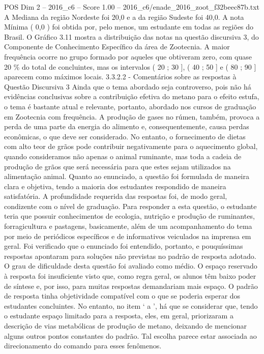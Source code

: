 \begin{textsample}{POS Dim 2 – 2016\_c6 – Score 1.00 – 2016\_c6/enade\_2016\_zoot\_f32beec87b.txt}
A Mediana da região Nordeste foi 20,0 e a da região Sudeste foi 40,0.
A nota Mínima ( 0,0 ) foi obtida por, pelo menos, um estudante em todas as regiões do Brasil.
O Gráfico 3.11 mostra a distribuição das notas na questão discursiva 3, do Componente de Conhecimento Específico da área de Zootecnia.
A maior frequência ocorre no grupo formado por aqueles que obtiveram zero, com quase 20 \% do total de concluintes, mas os intervalos ( 20 ; 30 ], ( 40 ; 50 ] e ( 80 ; 90 ] aparecem como máximos locais. 3.3.2.2 - Comentários sobre as respostas à Questão Discursiva 3 Ainda que o tema abordado seja controverso, pois não há evidências conclusivas sobre a contribuição efetiva do metano para o efeito estufa, o tema é bastante atual e relevante, portanto, abordado nos cursos de graduação em Zootecnia com frequência.
A produção de gases no rúmen, também, provoca a perda de uma parte da energia do alimento e, consequentemente, causa perdas econômicas, o que deve ser considerado.
No entanto, o fornecimento de dietas com alto teor de grãos pode contribuir negativamente para o aquecimento global, quando consideramos não apenas o animal ruminante, mas toda a cadeia de produção de grãos que será necessária para que estes sejam utilizados na alimentação animal.
Quanto ao enunciado, a questão foi formulada de maneira clara e objetiva, tendo a maioria dos estudantes respondido de maneira satisfatória.
A profundidade requerida das respostas foi, de modo geral, condizente com o nível de graduação.
Para responder a esta questão, o estudante teria que possuir conhecimentos de ecologia, nutrição e produção de ruminantes, forragicultura e pastagens, basicamente, além de um acompanhamento do tema por meio de periódicos específicos e de informativos veiculados na imprensa em geral.
Foi verificado que o enunciado foi entendido, portanto, e pouquíssimas respostas apontaram para soluções não previstas no padrão de resposta adotado.
O grau de dificuldade desta questão foi avaliado como médio.
O espaço reservado à resposta foi insuficiente visto que, como regra geral, os alunos têm baixo poder de síntese e, por isso, para muitas respostas demandariam mais espaço.
O padrão de resposta tinha objetividade compatível com o que se poderia esperar dos estudantes concluintes.
No entanto, no item ‘ a ’, há que se considerar que, tendo o estudante espaço limitado para a resposta, eles, em geral, priorizaram a descrição de vias metabólicas de produção de metano, deixando de mencionar alguns outros pontos constantes do padrão.
Tal escolha parece estar associada ao direcionamento do comando para esses fenômenos.

\end{textsample}
